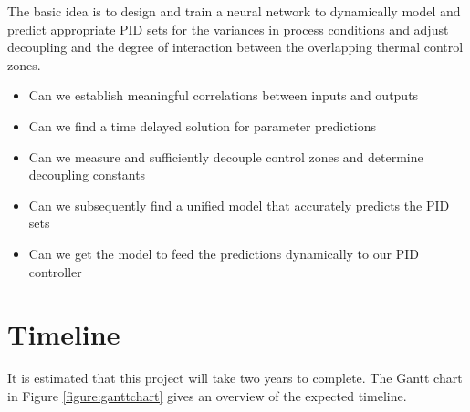 
    


    The basic idea is to design and train a neural network to dynamically model
    and predict appropriate PID sets for the variances in process conditions and 
    adjust decoupling and the degree of interaction between the overlapping thermal 
    control zones.

    \begin{itemize}
      \item Can we establish meaningful correlations between inputs and outputs
      \item Can we find a time delayed solution for parameter predictions
      \item Can we measure and sufficiently decouple control zones and determine
            decoupling constants
      \item Can we subsequently find a unified model that accurately predicts the PID sets
      \item Can we get the model to feed the predictions dynamically to our PID controller
    \end{itemize}

  \section{Timeline}
    It is estimated that this project will take two years to complete. The Gantt 
    chart in Figure \ref{figure:ganttchart} gives an overview of the expected timeline.

